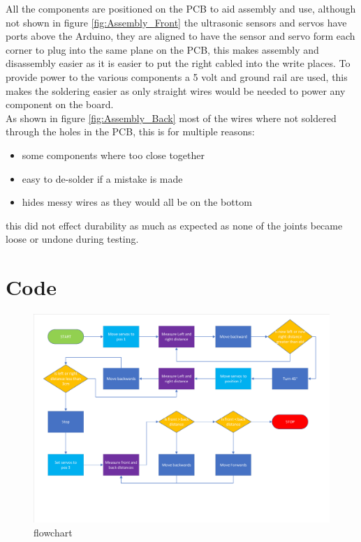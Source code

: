 All the components are positioned on the PCB to aid assembly and use, although not shown in figure \ref{fig:Assembly_Front} the ultrasonic sensors and servos have ports above the Arduino, they are aligned to have the sensor and servo form each corner to plug into the same plane on the PCB, this makes assembly and disassembly easier as it is easier to put the right cabled into the write places. To provide power to the various components a 5 volt and ground rail are used, this makes the soldering easier as only straight wires would be needed to power any component on the board.\\
As shown in figure \ref{fig:Assembly_Back} most of the wires where not soldered through the holes in the PCB, this is for multiple reasons:
\begin{itemize}
\item some components where too close together
\item easy to de-solder if a mistake is made
\item hides messy wires as they would all be on the bottom
\end{itemize}
this did not effect durability as much as expected as none of the joints became loose or undone during testing. 

\section{Code}

\begin{figure}[h]%
	\label{fig:parking_flowchart}
	\begin{center}
	\includegraphics[scale=0.6]{"assets/main_parking_flowchart"}
	\caption{flowchart}
	\end{center}
\end{figure}

